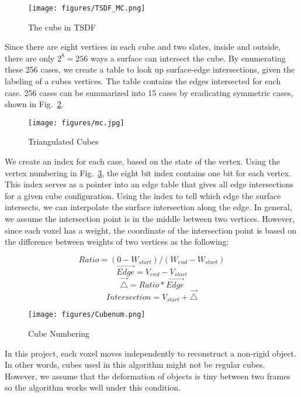 \documentclass{article}
\begin{document}
\begin{figure}[h]
\centering
\texttt{[image: figures/TSDF\_MC.png]}
\caption{The cube in TSDF}
\label{fig:tsdf_mc}
\end{figure}

Since there are eight vertices in each cube and two slates, inside and outside, there are only $2^8 = 256$ ways a surface can intersect the cube. By enumerating these 256 cases, we create a table to look up surface-edge intersections, given the labeling of a cubes vertices. The table contains the edges intersected for each case. 256 cases can be summarized into 15 cases by eradicating symmetric cases, shown in Fig.~\ref{fig:triangulation}.

\begin{figure}[h]
\centering
\texttt{[image: figures/mc.jpg]}
\caption{Triangulated Cubes}
\label{fig:triangulation}
\end{figure}

We create an index for each case, based on the state of the vertex. Using the vertex numbering in Fig.~\ref{fig:cubenum}, the eight bit index contains one bit for each vertex. This index serves as a pointer into an edge table that gives all edge intersections for a given cube configuration. Using the index to tell which edge the surface intersects, we can interpolate the surface intersection along the edge. In general, we assume the intersection point is in the middle between two vertices. However, since each voxel has a weight, the coordinate of the intersection point is based on the difference between weights of two vertices as the following:

\[Ratio = ( 0 - W_{start} ) / ( W_{end} - W_{start})\]
\[\overrightarrow{Edge} = V_{end}- V_{start}\]
\[\overrightarrow{\triangle} = Ratio * \overrightarrow{Edge}\]
\[Intersection = V_{start} + \overrightarrow{\triangle}\]


\begin{figure}[h]
\centering
\texttt{[image: figures/Cubenum.png]}
\caption{Cube Numbering}
\label{fig:cubenum}
\end{figure}

In this project, each voxel moves independently to reconstruct a non-rigid object. In other words, cubes used in this algorithm might not be regular cubes. However, we assume that the deformation of objects is tiny between two frames so the algorithm works well under this condition. 
\end{document}
